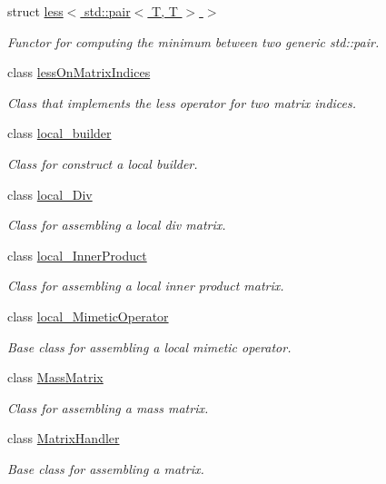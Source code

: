 \begin{DoxyCompactItemize}
struct \hyperlink{structFVCode3D_1_1less_3_01std_1_1pair_3_01T_00_01T_01_4_01_4}{less$<$ std\+::pair$<$ T, T $>$ $>$}
\begin{DoxyCompactList}\small\item\em Functor for computing the minimum between two generic std\+::pair. \end{DoxyCompactList}\item 
class \hyperlink{classFVCode3D_1_1lessOnMatrixIndices}{less\+On\+Matrix\+Indices}
\begin{DoxyCompactList}\small\item\em Class that implements the less operator for two matrix indices. \end{DoxyCompactList}\item 
class \hyperlink{classFVCode3D_1_1local__builder}{local\+\_\+builder}
\begin{DoxyCompactList}\small\item\em Class for construct a local builder. \end{DoxyCompactList}\item 
class \hyperlink{classFVCode3D_1_1local__Div}{local\+\_\+\+Div}
\begin{DoxyCompactList}\small\item\em Class for assembling a local div matrix. \end{DoxyCompactList}\item 
class \hyperlink{classFVCode3D_1_1local__InnerProduct}{local\+\_\+\+Inner\+Product}
\begin{DoxyCompactList}\small\item\em Class for assembling a local inner product matrix. \end{DoxyCompactList}\item 
class \hyperlink{classFVCode3D_1_1local__MimeticOperator}{local\+\_\+\+Mimetic\+Operator}
\begin{DoxyCompactList}\small\item\em Base class for assembling a local mimetic operator. \end{DoxyCompactList}\item 
class \hyperlink{classFVCode3D_1_1MassMatrix}{Mass\+Matrix}
\begin{DoxyCompactList}\small\item\em Class for assembling a mass matrix. \end{DoxyCompactList}\item 
class \hyperlink{classFVCode3D_1_1MatrixHandler}{Matrix\+Handler}
\begin{DoxyCompactList}\small\item\em Base class for assembling a matrix. \end{DoxyCompactList}\item 

\end{DoxyCompactItemize}
